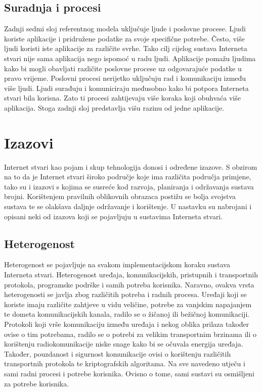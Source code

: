 \documentclass[times, utf8, diplomski]{fer}
\begin{document}
\subsection{Suradnja i procesi}
Zadnji sedmi sloj referentnog modela uključuje ljude i poslovne procese. Ljudi koriste aplikacije i pridružene podatke za svoje specifične potrebe. Često, više ljudi koristi iste aplikacije za različite svrhe. Tako cilj cijelog sustava Interneta stvari nije sama aplikacija nego ispomoć u radu ljudi. Aplikacije pomažu ljudima kako bi mogli obavljati različite poslovne procese uz odgovarajuće podatke u pravo vrijeme. Poslovni procesi nerijetko uključuju rad i komunikaciju između više ljudi. Ljudi surađuju i komuniciraju međusobno kako bi potpora Interneta stvari bila korisna. Zato ti procesi zahtijevaju više koraka koji obuhvaća više aplikacija. Stoga zadnji sloj predstavlja višu razinu od jedne aplikacije.

\section{Izazovi}
Internet stvari kao pojam i skup tehnologija donosi i određene izazove. S obzirom na to da je Internet stvari široko područje koje ima različita područja primjene, tako su i izazovi s kojima se susreće kod razvoja, planiranja i održavanja sustava brojni. Korištenjem pravilnih oblikovnih obrazaca postižu se bolja svojstva sustava te se olakšava daljnje održavanje i korištenje. U nastavku su nabrojani i opisani neki od izazova koji se pojavljuju u sustavima Interneta stvari.

\subsection{Heterogenost}
Heterogenost se pojavljuje na svakom implementacijskom koraku sustava Interneta stvari. Heterogenost uređaja, komunikacijskih, pristupnih i transportnih protokola, programske podrške i samih potreba korisnika. Naravno, ovakva vrsta heterogenosti se javlja zbog različitih potreba i radnih procesa. Uređaji koji se koriste imaju različite zahtjeve u vidu veličine, potrebe za vanjskim napajanjem te dometa komunikacijskih kanala, radilo se o žičanoj ili bežičnoj komunikaciji. Protokoli koji vrše komunikaciju između uređaja i nekog oblika prilaza također ovise o tim potrebama, radilo se o potrebi za velikim transportnim brzinama ili o korištenju radiokomunikacije niske snage kako bi se očuvala energija uređaja. Također, pouzdanost i sigurnost komunikacije ovisi o korištenju različitih transportnih protokola te kriptografskih algoritama. Na sve navedeno utječu i sami radni procesi i potrebe korisnika. Ovisno o tome, sami sustavi su osmišljeni za potrebe korisnika.
\end{document}
